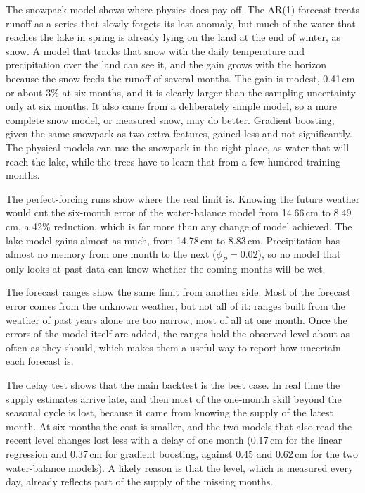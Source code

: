 \documentclass{article}
\begin{document}
The snowpack model shows where physics does pay off. The AR(1) forecast treats runoff as a series
that slowly forgets its last anomaly, but much of the water that reaches the lake in spring is
already lying on the land at the end of winter, as snow. A model that tracks that snow with the
daily temperature and precipitation over the land can see it, and the gain grows with the horizon
because the snow feeds the runoff of several months. The gain is modest, 0.41\,cm or about 3\% at
six months, and it is clearly larger than the sampling uncertainty only at six months. It also
came from a deliberately simple model, so a more complete snow model, or measured snow, may do
better. Gradient boosting, given the same snowpack as two extra features, gained less and not
significantly. The physical models can use the snowpack in the right place, as water that will
reach the lake, while the trees have to learn that from a few hundred training months.

The perfect-forcing runs show where the real limit is. Knowing the future weather would cut the
six-month error of the water-balance model from 14.66\,cm to 8.49\,cm, a 42\% reduction, which is
far more than any change of model achieved. The lake model gains almost as much, from 14.78\,cm
to 8.83\,cm. Precipitation has almost no memory from one month to the next ($\phi_P = 0.02$), so
no model that only looks at past data can know whether the coming months will be wet.

The forecast ranges show the same limit from another side. Most of the forecast error comes from
the unknown weather, but not all of it: ranges built from the weather of past years alone are too
narrow, most of all at one month. Once the errors of the model itself are added, the ranges hold
the observed level about as often as they should, which makes them a useful way to report how
uncertain each forecast is.

The delay test shows that the main backtest is the best case. In real time the supply estimates
arrive late, and then most of the one-month skill beyond the seasonal cycle is lost, because it
came from knowing the supply of the latest month. At six months the cost is smaller, and the two
models that also read the recent level changes lost less with a delay of one month (0.17\,cm for
the linear regression and 0.37\,cm for gradient boosting, against 0.45 and 0.62\,cm for the two
water-balance models). A likely reason is that the level, which is measured every day, already
reflects part of the supply of the missing months.
\end{document}
